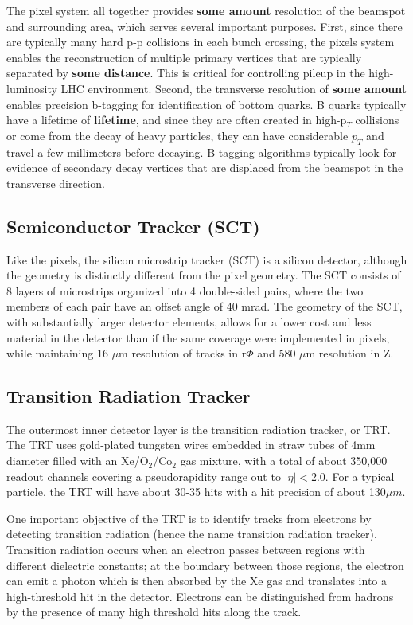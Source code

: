 The pixel system all together provides \textbf{some amount} resolution of the beamspot and surrounding area, which serves several important purposes.  First, since there are typically many hard p-p collisions in each bunch crossing, the pixels system enables the reconstruction of multiple primary vertices that are typically separated by \textbf{some distance}.  This is critical for controlling pileup in the high-luminosity LHC environment.  Second, the transverse resolution of \textbf{some amount} enables precision b-tagging for identification of bottom quarks.  B quarks typically have a lifetime of \textbf{lifetime}, and since they are often created in high-p$_T$ collisions or come from the decay of heavy particles, they can have considerable $p_T$ and travel a few millimeters before decaying.  B-tagging algorithms typically look for evidence of secondary decay vertices that are displaced from the beamspot in the transverse direction.   

\subsection{Semiconductor Tracker (SCT)}
Like the pixels, the silicon microstrip tracker (SCT) is a silicon detector, although the geometry is distinctly different from the pixel geometry.  The SCT consists of 8 layers of microstrips organized into 4 double-sided pairs, where the two members of each pair have an offset angle of 40 mrad.  The geometry of the SCT, with substantially larger detector elements, allows for a lower cost and less material in the detector than if the same coverage were implemented in pixels, while maintaining 16 $\mu$m resolution of tracks in r$\Phi$ and 580 $\mu$m resolution in Z.   

\subsection{Transition Radiation Tracker}
The outermost inner detector layer is the transition radiation tracker, or TRT.  The TRT uses gold-plated tungsten wires embedded in straw tubes of 4mm diameter filled with an Xe/O$_2$/Co$_2$ gas mixture, with a total of about 350,000 readout channels covering a pseudorapidity range out to $|\eta|<$2.0.  For a typical particle, the TRT will have about 30-35 hits with a hit precision of about 130$\mu m$.

One important objective of the TRT is to identify tracks from electrons by detecting transition radiation (hence the name transition radiation tracker).  Transition radiation occurs when an electron passes between regions with different dielectric constants; at the boundary between those regions, the electron can emit a photon which is then absorbed by the Xe gas and translates into a high-threshold hit in the detector.  Electrons can be distinguished from hadrons by the presence of many high threshold hits along the track.

